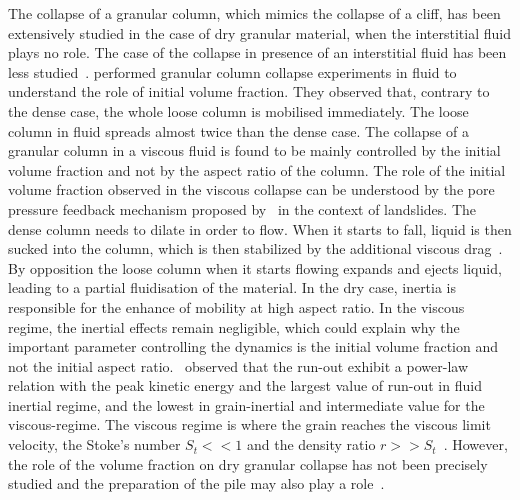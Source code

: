 The collapse of a granular column, which mimics the collapse of a cliff, has 
been extensively studied in the case of dry granular material, when the 
interstitial fluid plays no role. The case of the collapse in presence of an 
interstitial fluid has been less studied~\citep{Topin2012}. 
\citet{Rondon2011} performed granular column collapse experiments in fluid to 
understand the role of initial volume fraction. They observed that, contrary to 
the dense case, the whole loose column is mobilised immediately. The loose 
column in fluid spreads almost twice than the dense case. The 
collapse of a granular column in a viscous fluid is found to be mainly 
controlled by the initial volume fraction and not by the aspect ratio of the 
column. The role of the initial volume fraction observed in the viscous 
collapse can be understood by the pore pressure feedback mechanism proposed 
by~\citep{Schaeffer2008,Iverson2000} in the context of landslides. The dense 
column needs to dilate in order to flow. When it starts to fall, liquid
is then sucked into the column, which is then stabilized by the additional 
viscous drag~\citep{Rondon2011,Topin2012}. By opposition the loose column when 
it starts flowing expands and ejects liquid, leading to a partial fluidisation 
of the material. In the dry case, inertia is responsible for the enhance of 
mobility at high aspect ratio. In the viscous regime, the inertial effects 
remain negligible, which could explain why the important parameter controlling 
the dynamics is the initial volume fraction and not the initial aspect 
ratio.~\citet{Topin2011} observed that the run-out exhibit a power-law relation 
with the peak kinetic energy and the largest value of run-out in fluid inertial 
regime, and the lowest in grain-inertial and intermediate value for the 
viscous-regime. The viscous regime is where the grain reaches the viscous 
limit velocity, the Stoke's number $S_t << 1$ and the density ratio $r >> 
S_t$~\citep{CourrechDuPont2003}. However, the role of the volume fraction on 
dry granular collapse has not been precisely studied and the preparation of the 
pile may also play a role~\citet{Daerr1999a}.

